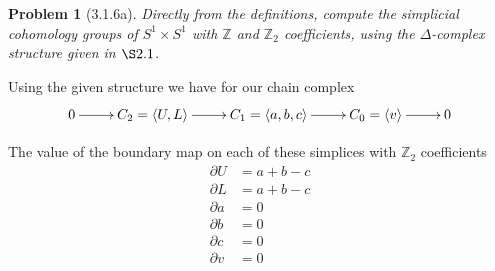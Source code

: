 \documentclass[10pt]{article}
\newcommand{\bb}[1]{\mathbb{#1}}
\theoremstyle{plain}
\newtheorem{problem}{Problem}
\theoremstyle{remark}
\begin{document}
\begin{problem}[3.1.6a]
  Directly from the definitions, compute the simplicial cohomology groups of
  $S^1\times S^1$ with $\bb{Z}$ and $\bb{Z}_2$ coefficients, using the
  $\Delta$-complex structure given in $\S 2.1$.
\end{problem}

Using the given structure we have for our chain complex
\[
  \xymatrix{
    0 \ar[r] & C_2=\langle U,L\rangle \ar[r] & C_1=\langle a,b,c\rangle \ar[r] & C_0=\langle v\rangle \ar[r] & 0
  }
\]

The value of the boundary map on each of these simplices with $\bb{Z}_2$
coefficients
\begin{align*}
  \partial U&= a+b-c\\
  \partial L&= a+b-c\\
  \partial a&= 0\\
  \partial b&= 0\\
  \partial c&= 0\\
  \partial v&= 0\\
\end{align*}
\end{document}
